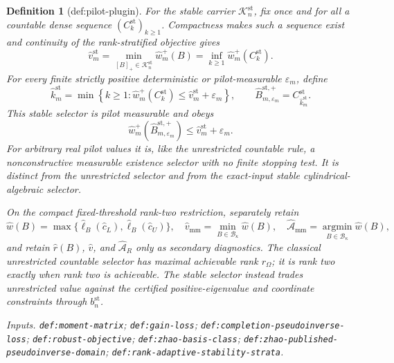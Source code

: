 \documentclass{article}
\newtheorem{definition}{Definition}
\begin{document}
\begin{definition}[def:pilot-plugin]
For the stable carrier \(\mathcal K_n^{\mathrm{st}}\), fix once and for all a countable dense sequence \((C_k^{\mathrm{st}})_{k\ge1}\).  Compactness makes such a sequence exist and continuity of the rank-stratified objective gives
\[
\widehat v_m^{\mathrm{st}}
=\min_{[B]_+\in\mathcal K_n^{\mathrm{st}}}\widehat w_m^+(B)
=\inf_{k\ge1}\widehat w_m^+(C_k^{\mathrm{st}}).
\]
For every finite strictly positive deterministic or pilot-measurable \(\varepsilon_m\), define
\[
\widehat k_m^{\mathrm{st}}
=\min\left\{k\ge1:
\widehat w_m^+(C_k^{\mathrm{st}})
\le\widehat v_m^{\mathrm{st}}+\varepsilon_m\right\},
\qquad
\widehat B_{m,\varepsilon_m}^{\mathrm{st},+}
=C_{\widehat k_m^{\mathrm{st}}}^{\mathrm{st}}.
\]
This stable selector is pilot measurable and obeys
\[
\widehat w_m^+(\widehat B_{m,\varepsilon_m}^{\mathrm{st},+})
\le\widehat v_m^{\mathrm{st}}+\varepsilon_m.
\]
For arbitrary real pilot values it is, like the unrestricted countable rule, a nonconstructive measurable existence selector with no finite stopping test.  It is distinct from the unrestricted selector and from the exact-input stable cylindrical-algebraic selector.

On the compact fixed-threshold rank-two restriction, separately retain
\[
\widehat w(B)=\max\{\widehat\ell_B(\widehat c_L),\widehat\ell_B(\widehat c_U)\},
\quad
\widehat v_{\mathrm{mm}}=\min_{B\in\mathcal B_\kappa}\widehat w(B),
\quad
\widehat{\mathcal A}_{\mathrm{mm}}=\operatorname*{argmin}_{B\in\mathcal B_\kappa}\widehat w(B),
\]
and retain \(\widehat r(B)\), \(\widehat v\), and \(\widehat{\mathcal A}_R\) only as secondary diagnostics.  The classical unrestricted countable selector has maximal achievable rank \(r_\Omega\); it is rank two exactly when rank two is achievable.  The stable selector instead trades unrestricted value against the certified positive-eigenvalue and coordinate constraints through \(b_n^{\mathrm{st}}\).
\par\smallskip\noindent\emph{Inputs.} \texttt{def:\allowbreak{}moment-\allowbreak{}matrix}; \texttt{def:\allowbreak{}gain-\allowbreak{}loss}; \texttt{def:\allowbreak{}completion-\allowbreak{}pseudoinverse-\allowbreak{}loss}; \texttt{def:\allowbreak{}robust-\allowbreak{}objective}; \texttt{def:\allowbreak{}zhao-\allowbreak{}basis-\allowbreak{}class}; \texttt{def:\allowbreak{}zhao-\allowbreak{}published-\allowbreak{}pseudoinverse-\allowbreak{}domain}; \texttt{def:\allowbreak{}rank-\allowbreak{}adaptive-\allowbreak{}stability-\allowbreak{}strata}.
\end{definition}
\end{document}
